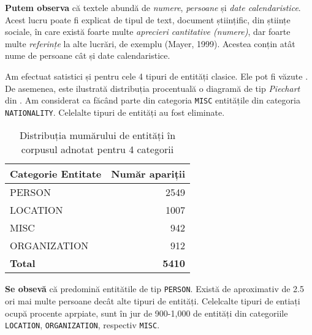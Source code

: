 
\textbf{Putem observa} că textele abundă de \textit{numere}, \textit{persoane} și \textit{date calendaristice}. Acest lucru poate fi explicat de tipul de text, document științific, din științe sociale, în care există foarte multe \textit{aprecieri cantitative (numere)}, dar foarte multe \textit{referințe} la alte lucrări, de exemplu (Mayer, 1999). Acestea conțin atât nume de persoane cât și date calendaristice.

Am efectuat satistici și pentru cele 4 tipuri de entități clasice. Ele pot fi văzute . De asemenea, este ilustrată distribuția procentuală o diagramă de tip \textit{Piechart} din . Am considerat ca făcând parte din categoria \texttt{MISC} entitățile din categoria \texttt{NATIONALITY}. Celelalte tipuri de entități au fost eliminate. 




\begin{center}
\begin{table}[htb]
  \caption{Distribuția mumărului de entități în corpusul adnotat pentru 4 categorii}
  \begin{tabular}{|l|r|}
  \hline
   Categorie Entitate & Număr apariții\\
   \hline
  PERSON	&	2549	\\
  LOCATION	&	1007	\\
  MISC	&	942	\\
  ORGANIZATION	&	912	\\
   \hline
   \textbf{Total} 	&	\textbf{5410} \\
   \hline
   
  \end{tabular}
  \label{table:top-entites-4-categories}
\end{table}
\end{center}




\textbf{Se obsevă} că predomină entitătile de tip \texttt{PERSON}. Există de aproximativ de 2.5 ori mai multe persoane decât alte tipuri de entități. Celelcalte tipuri de entiați ocupă procente aprpiate, sunt în jur de 900-1,000 de entități din categoriile \texttt{LOCATION}, \texttt{ORGANIZATION}, respectiv \texttt{MISC}.

